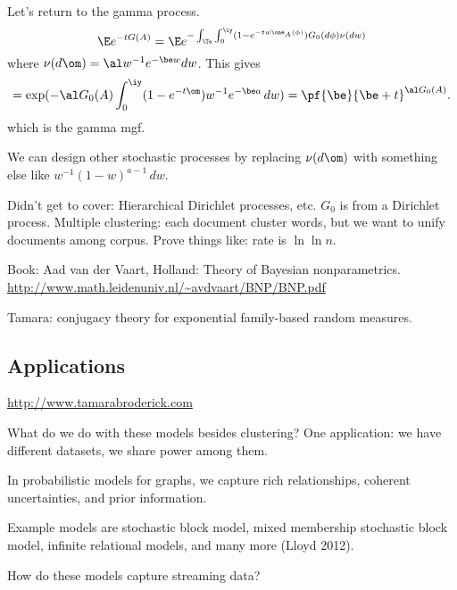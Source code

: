 Let's return to the gamma process.
$$
\E e^{-t G(A)} = \E e^{-\int_\Te \int_0^\iy (1-e^{-tw \one_A(\phi)}) G_0(d\phi) \nu(dw)}
$$
where $\nu(d\om)  = \al w^{-1} e^{-\be w}dw$.
This gives
$$
 = \exp(-\al G_0(A)\int_0^\iy (1-e^{-t\om}) w^{-1} e^{-\be a}\,dw) = \pf{\be}{\be+ t}^{\al G_0(A)}.
$$
which is the gamma mgf.

We can design other stochastic processes by  replacing $\nu(d\om)$ with something else like $w^{-1}(1-w)^{a-1}\,dw$.



Didn't get to cover: Hierarchical Dirichlet processes, etc. $G_0$ is from a Dirichlet process. Multiple clustering: each document cluster words, but we want to unify  documents among corpus. 
Prove things like: rate is $\ln\ln n$. 

Book: %
Aad van der Vaart, Holland: Theory of Bayesian nonparametrics. %
\url{http://www.math.leidenuniv.nl/~avdvaart/BNP/BNP.pdf}


Tamara: conjugacy theory for exponential family-based random measures.

\subsection{Applications}

\url{http://www.tamarabroderick.com}

What do we do with these models besides clustering?
One application: we have different datasets, we share power among them. %

In probabilistic models for graphs, we capture rich relationships, coherent uncertainties, and prior information.

Example models are stochastic block model, mixed membership stochastic block model, infinite relational models, and many more (Lloyd 2012). 

How do these models capture streaming data?

